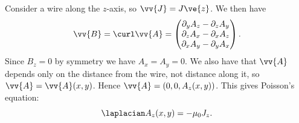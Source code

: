 \documentclass[fleqn]{NotesClass}
\begin{document}
    Consider a wire along the \(z\)-axis, so \(\vv{J} = J\ve{z}\).
    We then have
    \begin{equation}
        \vv{B} = \curl\vv{A} = 
        \begin{pmatrix}
            \partial_y A_z - \partial_z A_y\\
            \partial_z A_x - \partial_x A_z\\
            \partial_x A_y - \partial_y A_x
        \end{pmatrix}
        .
    \end{equation}
    Since \(B_z = 0\) by symmetry we have \(A_x = A_y = 0\).
    We also have that \(\vv{A}\) depends only on the distance from the wire, not distance along it, so \(\vv{A} = \vv{A}(x, y)\).
    Hence \(\vv{A} = (0, 0, A_z(x, y))\).
    This gives Poisson's equation:
    \begin{equation}
        \laplacian A_z(x, y) = -\mu_0 J_z.
    \end{equation}
    
    
    
    
%        

\backmatter
\renewcommand{\glossaryname}{Acronyms}
\printglossary[acronym]
\printindex
\end{document}
